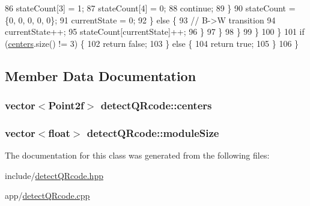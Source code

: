 \begin{DoxyCode}
86                 stateCount[3] = 1;
87                 stateCount[4] = 0;
88                 \textcolor{keywordflow}{continue};
89               \}
90               stateCount = \{0, 0, 0, 0, 0\};
91               currentState = 0;
92             \} \textcolor{keywordflow}{else} \{
93               \textcolor{comment}{// B->W transition}
94               currentState++;
95               stateCount[currentState]++;
96             \}
97           \}
98        \}
99     \}
100   \}
101   \textcolor{keywordflow}{if} (\hyperlink{classdetectQRcode_afe6facdb30c910a01e4f607d108a5db5}{centers}.size() != 3) \{
102   \textcolor{keywordflow}{return} \textcolor{keyword}{false};
103   \} \textcolor{keywordflow}{else} \{
104     \textcolor{keywordflow}{return} \textcolor{keyword}{true};
105   \}
106 \}
\end{DoxyCode}


\subsection{Member Data Documentation}
\subsubsection[{\texorpdfstring{centers}{centers}}]{\setlength{\rightskip}{0pt plus 5cm}vector$<$Point2f$>$ detect\+Q\+Rcode\+::centers}\hypertarget{classdetectQRcode_afe6facdb30c910a01e4f607d108a5db5}{}\label{classdetectQRcode_afe6facdb30c910a01e4f607d108a5db5}
\subsubsection[{\texorpdfstring{module\+Size}{moduleSize}}]{\setlength{\rightskip}{0pt plus 5cm}vector$<$float$>$ detect\+Q\+Rcode\+::module\+Size}\hypertarget{classdetectQRcode_a5f57e433cf4135aa0bf236dee35ff044}{}\label{classdetectQRcode_a5f57e433cf4135aa0bf236dee35ff044}


The documentation for this class was generated from the following files\+:\begin{DoxyCompactItemize}
\item 
include/\hyperlink{detectQRcode_8hpp}{detect\+Q\+Rcode.\+hpp}\item 
app/\hyperlink{detectQRcode_8cpp}{detect\+Q\+Rcode.\+cpp}\end{DoxyCompactItemize}
